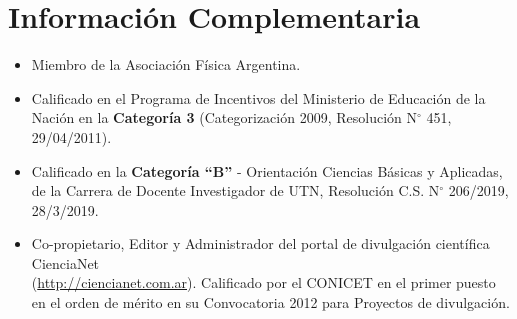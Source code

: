 \section{Información Complementaria}

\begin{itemize}
\item Miembro de la Asociación Física Argentina.

 \item Calificado en el Programa de Incentivos del Ministerio de Educación de la Nación en
la \textbf{Categoría 3} (Categorización 2009, Resolución N$^{\circ}$ 451, 29/04/2011).

\item Calificado en la \textbf{Categoría ``B''} - Orientación Ciencias Básicas y Aplicadas, de la Carrera de Docente Investigador de UTN, Resolución C.S. N$^{\circ}$ 206/2019, 28/3/2019.

\item Co-propietario, Editor y Administrador del portal de divulgación científica CienciaNet \\ (\href{http://ciencianet.com.ar}{http://ciencianet.com.ar}). Calificado por el CONICET en el primer puesto en el orden de mérito en su Convocatoria 2012 para Proyectos de divulgación.


\end{itemize}
